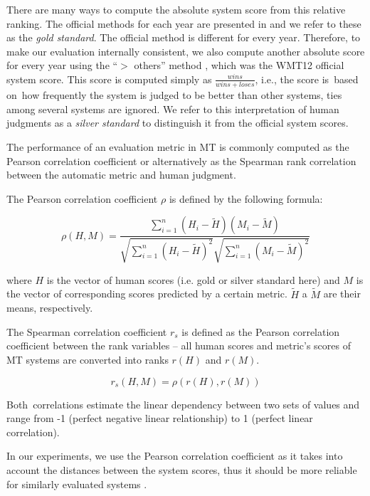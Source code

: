 There are many ways to compute the absolute system score from this relative
ranking. The official methods for each year are presented in  
and we refer to these as the \textit{gold standard}. The official method is
different for every year. Therefore, to make our evaluation internally 
consistent, we also compute another absolute score for every year using the 
“$ >$ others” method \citep{bojar-grains}, which was the WMT12 official system
score. This score is computed simply as $\frac{wins}{wins+loses} $, i.e., the 
score is~based on~how frequently the system is judged to be better than 
other systems, ties among several systems are ignored. We refer to this 
interpretation of human judgments as a \textit{silver standard} to distinguish
it from the official system scores. %

The performance of an evaluation metric in MT is commonly computed as the
Pearson correlation coefficient or alternatively as the Spearman rank 
correlation between the automatic metric and human judgment. 

The Pearson correlation coefficient $\rho$ is defined by the following formula:

\begin{equation*}
\rho(H,M) = \frac{ \sum_{i=1}^{n}{(H_i - \tilde{H})(M_i - \tilde{M})}}{ \sqrt{ \sum_{i=1}^{n}{(H_i - \tilde{H})^2} }  \sqrt{ \sum_{i=1}^{n}{(M_i - \tilde{M})^2} } } 
\end{equation*}

where $H$ is the vector of human scores (i.e. gold or silver standard here) and 
$M$ is the vector of corresponding scores predicted by a certain metric. 
$\tilde{H}$ a $\tilde{M}$ are their means, respectively. 

The Spearman correlation coefficient $r_{s} $ is defined as the Pearson 
correlation coefficient between the rank variables -- all human scores and  
metric’s scores of MT systems are converted into ranks $r(H)$ and $r(M)$.

\begin{equation*}
r_{s}(H,M) = \rho(r(H),r(M))
\end{equation*}

Both~correlations estimate the linear dependency between two sets of values and 
range from -1 (perfect negative linear relationship) to 1 (perfect linear correlation). 

In our experiments, we use the Pearson correlation coefficient as it takes into 
account the distances between the system scores, thus it should be more 
reliable for similarly evaluated systems \citep{machacek-bojar-2014-results}. 

